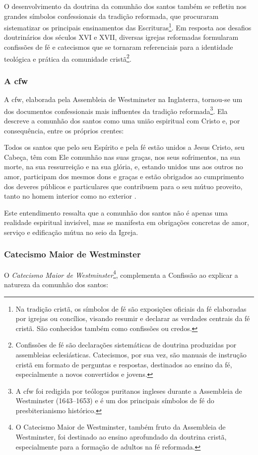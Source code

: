 O desenvolvimento da doutrina da comunhão dos santos também se refletiu nos grandes símbolos confessionais da tradição reformada, que procuraram sistematizar os principais ensinamentos das Escrituras\footnote{Na tradição cristã, os símbolos de fé são exposições oficiais da fé elaboradas por igrejas ou concílios, visando resumir e declarar as verdades centrais da fé cristã. São conhecidos também como confissões ou credos.}. Em resposta aos desafios doutrinários dos séculos XVI e XVII, diversas igrejas reformadas formularam confissões de fé e catecismos que se tornaram referenciais para a identidade teológica e prática da comunidade cristã\footnote{Confissões de fé são declarações sistemáticas de doutrina produzidas por assembleias eclesiásticas. Catecismos, por sua vez, são manuais de instrução cristã em formato de perguntas e respostas, destinados ao ensino da fé, especialmente a novos convertidos e jovens.}.

\subsubsection{A \gls{cfw}} 
A \gls{cfw}, elaborada pela Assembleia de Westminster na Inglaterra, tornou-se um dos documentos confessionais mais influentes da tradição reformada\footnote{A \gls{cfw} foi redigida por teólogos puritanos ingleses durante a Assembleia de Westminster (1643–1653) e é um dos principais símbolos de fé do presbiterianismo histórico.}. Ela descreve a comunhão dos santos como uma união espiritual com Cristo e, por consequência, entre os próprios crentes:

\begin{citacao}
    Todos os santos que pelo seu Espírito e pela fé estão unidos a Jesus Cristo, seu Cabeça, têm com Ele comunhão nas suas graças, nos seus sofrimentos, na sua morte, na sua ressurreição e na sua glória, e, estando unidos uns aos outros no amor, participam dos mesmos dons e graças e estão obrigados ao cumprimento dos deveres públicos e particulares que contribuem para o seu mútuo proveito, tanto no homem interior como no exterior \cite[Cap.~XXVI, §~1º]{cfw}.
\end{citacao}

Este entendimento ressalta que a comunhão dos santos não é apenas uma realidade espiritual invisível, mas se manifesta em obrigações concretas de amor, serviço e edificação mútua no seio da Igreja.

\subsubsection{Catecismo Maior de Westminster}
O \textit{Catecismo Maior de Westminster}\footnote{O Catecismo Maior de Westminster, também fruto da Assembleia de Westminster, foi destinado ao ensino aprofundado da doutrina cristã, especialmente para a formação de adultos na fé reformada.}, complementa a Confissão ao explicar a natureza da comunhão dos santos:

